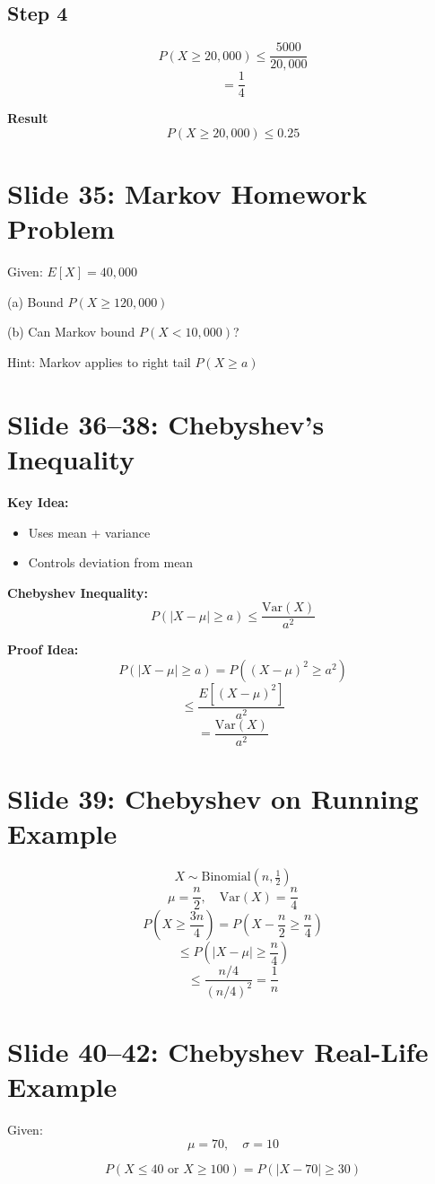 \documentclass[12pt]{article}
\begin{document}
\subsection*{Step 4}
\[
P(X \ge 20,000) \le \frac{5000}{20,000}
\]
\[
= \frac{1}{4}
\]

\textbf{Result}
\[
P(X \ge 20,000) \le 0.25
\]

\section*{Slide 35: Markov Homework Problem}
Given:  
\( E[X] = 40,000 \)

(a) Bound \( P(X \ge 120,000) \)  

(b) Can Markov bound \( P(X < 10,000) \)?  

Hint:  
Markov applies to right tail \( P(X \ge a) \)  

\section*{Slide 36–38: Chebyshev’s Inequality}
\textbf{Key Idea:}
\begin{itemize}
\item Uses mean + variance  
\item Controls deviation from mean  
\end{itemize}

\textbf{Chebyshev Inequality:}
\[
P(|X - \mu| \ge a) \le \frac{\text{Var}(X)}{a^2}
\]

\textbf{Proof Idea:}
\[
P(|X - \mu| \ge a) = P((X - \mu)^2 \ge a^2)
\]
\[
\le \frac{E[(X - \mu)^2]}{a^2}
\]
\[
= \frac{\text{Var}(X)}{a^2}
\]

\section*{Slide 39: Chebyshev on Running Example}
\[
X \sim \text{Binomial}(n, \tfrac{1}{2})
\]
\[
\mu = \frac{n}{2}, \quad \text{Var}(X) = \frac{n}{4}
\]
\[
P\left(X \ge \frac{3n}{4}\right)
= P\left(X - \frac{n}{2} \ge \frac{n}{4}\right)
\]
\[
\le P\left(|X - \mu| \ge \frac{n}{4}\right)
\]
\[
\le \frac{n/4}{(n/4)^2}
= \frac{1}{n}
\]

\section*{Slide 40–42: Chebyshev Real-Life Example}
Given:
\[
\mu = 70, \quad \sigma = 10
\]

\[
P(X \le 40 \text{ or } X \ge 100)
= P(|X - 70| \ge 30)
\]
\end{document}

